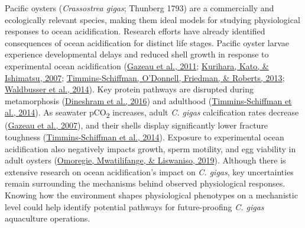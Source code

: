 \documentclass [11pt, proquest] {uwthesis}[2015/03/03]
\begin{document}
Pacific oysters (\emph{Crassostrea gigas}; Thunberg 1793) are a commercially and ecologically relevant species, making them ideal models for studying physiological responses to ocean acidification. Research efforts have already identified consequences of ocean acidification for distinct life stages. Pacific oyster larvae experience developmental delays and reduced shell growth in response to experimental ocean acidification (\protect\hyperlink{ref-Gazeau2011}{Gazeau et al., 2011}; \protect\hyperlink{ref-Kurihara2007}{Kurihara, Kato, \& Ishimatsu, 2007}; \protect\hyperlink{ref-Timmins-Schiffman2013}{Timmins-Schiffman, O'Donnell, Friedman, \& Roberts, 2013}; \protect\hyperlink{ref-Waldbusser2014}{Waldbusser et al., 2014}). Key protein pathways are disrupted during metamorphosis (\protect\hyperlink{ref-Dineshram2016}{Dineshram et al., 2016}) and adulthood (\protect\hyperlink{ref-Timmins-Schiffman2014}{Timmins-Schiffman et al., 2014}). As seawater pCO\textsubscript{2} increases, adult \emph{C. gigas} calcification rates decrease (\protect\hyperlink{ref-Gazeau2007}{Gazeau et al., 2007}), and their shells display significantly lower fracture toughness (\protect\hyperlink{ref-Timmins-Schiffman2014}{Timmins-Schiffman et al., 2014}). Exposure to experimental ocean acidification also negatively impacts growth, sperm motility, and egg viability in adult oysters (\protect\hyperlink{ref-Omoregie2019}{Omoregie, Mwatilifange, \& Liswaniso, 2019}). Although there is extensive research on ocean acidification's impact on \emph{C. gigas}, key uncertainties remain surrounding the mechanisms behind observed physiological responses. Knowing how the environment shapes physiological phenotypes on a mechanistic level could help identify potential pathways for future-proofing \emph{C. gigas} aquaculture operations.
\end{document}
